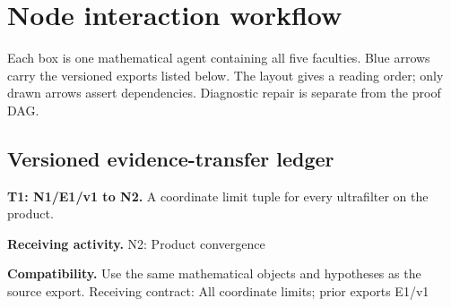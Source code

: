 \documentclass[preprint,12pt,aps,pra,showkeys,amsmath,amssymb,superscriptaddress,floatfix]{revtex4-2}
\theoremstyle{definition}
\theoremstyle{remark}
\newcommand{\field}[2]{\par\smallskip\noindent\textbf{#1.} #2\par}
\begin{document}
\clearpage\section{Node interaction workflow}

\begin{center}\end{center}

Each box is one mathematical agent containing all five faculties. Blue
arrows carry the versioned exports listed below. The layout gives a
reading order; only drawn arrows assert dependencies. Diagnostic repair
is separate from the proof DAG.

\subsection{Versioned evidence-transfer ledger}

\begingroup\small\linespread{1.05}\selectfont

\field{T1: N1/E1/v1 to N2}{A coordinate limit tuple for every ultrafilter on the product.}

\field{Receiving activity}{N2: Product convergence}

\field{Compatibility}{Use the same mathematical objects and hypotheses as the source export.
Receiving contract: All coordinate limits; prior exports E1/v1}
\end{document}
